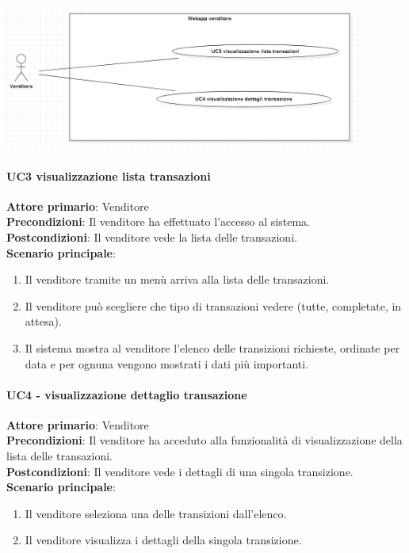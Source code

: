 \documentclass[a4paper, 12pt]{article}
\begin{document}
\includegraphics[width=0.9\textwidth]{UseCase_venditore3.png}

\paragraph{UC3 visualizzazione lista transazioni}
\textbf{Attore primario}: Venditore \\
\textbf{Precondizioni}: Il venditore ha effettuato l'accesso al sistema.\\
\textbf{Postcondizioni}:  Il venditore vede la lista delle transazioni.\\
\textbf{Scenario principale}:
\begin{enumerate}
\item Il venditore tramite un menù arriva alla lista delle transazioni.
\item Il venditore può scegliere che tipo di transazioni vedere (tutte, completate, in attesa).
\item Il sistema mostra al venditore l'elenco delle transizioni richieste, ordinate per data e per ognuna vengono mostrati i dati più importanti.
\end{enumerate}

\paragraph{UC4 - visualizzazione dettaglio transazione}
\textbf{Attore primario}: Venditore\\
\textbf{Precondizioni}: Il venditore ha acceduto alla funzionalità di visualizzazione della lista delle transazioni.\\
\textbf{Postcondizioni}: Il venditore vede i dettagli di una singola transizione.\\
\textbf{Scenario principale}:
\begin{enumerate}
\item Il venditore seleziona una delle transizioni dall'elenco.
\item Il venditore visualizza i dettagli della singola transizione.
\end{enumerate}
\end{document}
